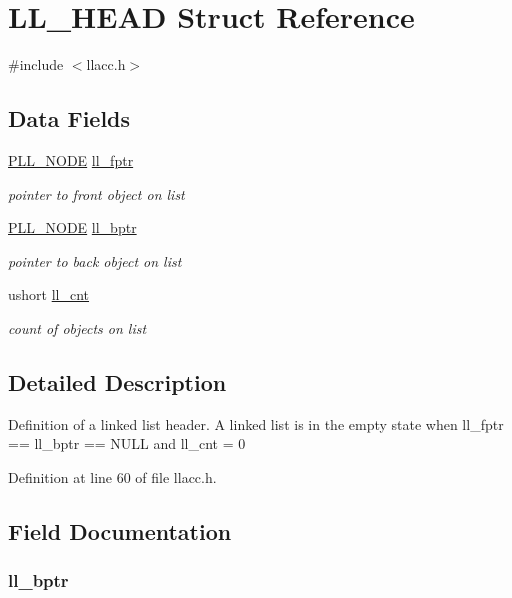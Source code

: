 \hypertarget{struct_l_l___h_e_a_d}{\section{L\-L\-\_\-\-H\-E\-A\-D Struct Reference}
\label{struct_l_l___h_e_a_d}
}


{\ttfamily \#include $<$llacc.\-h$>$}

\subsection*{Data Fields}
\begin{DoxyCompactItemize}
\item 
\hyperlink{llacc_8h_a52e28955e3d942c3cdddbbc5f514c3a1}{P\-L\-L\-\_\-\-N\-O\-D\-E} \hyperlink{struct_l_l___h_e_a_d_abca293007231e28e54ebc3513a42aa95}{ll\-\_\-fptr}
\begin{DoxyCompactList}\small\item\em pointer to front object on list \end{DoxyCompactList}\item 
\hyperlink{llacc_8h_a52e28955e3d942c3cdddbbc5f514c3a1}{P\-L\-L\-\_\-\-N\-O\-D\-E} \hyperlink{struct_l_l___h_e_a_d_a46f892e5668f348ca590c2ed7048b9da}{ll\-\_\-bptr}
\begin{DoxyCompactList}\small\item\em pointer to back object on list \end{DoxyCompactList}\item 
ushort \hyperlink{struct_l_l___h_e_a_d_a93421b80d51d8e167ae35c25bed52ddf}{ll\-\_\-cnt}
\begin{DoxyCompactList}\small\item\em count of objects on list \end{DoxyCompactList}\end{DoxyCompactItemize}


\subsection{Detailed Description}
Definition of a linked list header. A linked list is in the empty state when ll\-\_\-fptr == ll\-\_\-bptr == N\-U\-L\-L and ll\-\_\-cnt = 0 

Definition at line 60 of file llacc.\-h.



\subsection{Field Documentation}
\hypertarget{struct_l_l___h_e_a_d_a46f892e5668f348ca590c2ed7048b9da}{
\subsubsection[{ll\-\_\-bptr}]{ ll\-\_\-bptr}}\label{struct_l_l___h_e_a_d_a46f892e5668f348ca590c2ed7048b9da}


